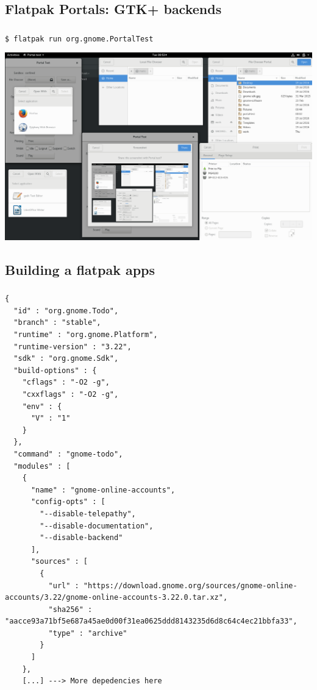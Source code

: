 \subsection{Flatpak Portals: GTK+ backends}
\begin{frame}[fragile]
  \frametitle{\insertsubsection}

  \texttt{\$ flatpak run org.gnome.PortalTest}
  \begin{center}
    \includegraphics[width=1\textwidth]{images/portals.png}
  \end{center}

\end{frame}

\subsection{Building a flatpak apps}
\begin{frame}[fragile]
  \frametitle{\insertsubsection}

    \begin{tiny}
\begin{verbatim}
{
  "id" : "org.gnome.Todo",
  "branch" : "stable",
  "runtime" : "org.gnome.Platform",
  "runtime-version" : "3.22",
  "sdk" : "org.gnome.Sdk",
  "build-options" : {
    "cflags" : "-O2 -g",
    "cxxflags" : "-O2 -g",
    "env" : {
      "V" : "1"
    }
  },
  "command" : "gnome-todo",
  "modules" : [
    {
      "name" : "gnome-online-accounts",
      "config-opts" : [
        "--disable-telepathy",
        "--disable-documentation",
        "--disable-backend"
      ],
      "sources" : [
        {
          "url" : "https://download.gnome.org/sources/gnome-online-accounts/3.22/gnome-online-accounts-3.22.0.tar.xz",
          "sha256" : "aacce93a71bf5e687a45ae0d00f31ea0625ddd8143235d6d8c64c4ec21bbfa33",
          "type" : "archive"
        }
      ]
    },
    [...] ---> More depedencies here
\end{verbatim}
    \end{tiny}
\end{frame}

